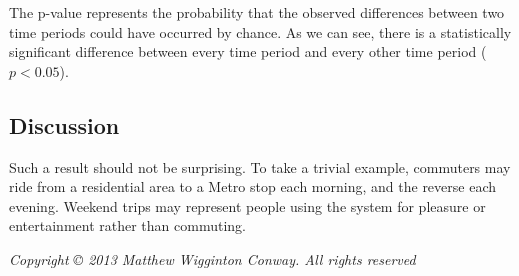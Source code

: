 \documentclass[letterpaper,11pt]{article}
\begin{document}
\noindent 

The p-value represents the probability that the observed differences
between two time periods could have occurred by chance. As we can see,
there is a statistically significant difference between every time
period and every other time period ($p < 0.05$).

\subsection{Discussion}

Such a result should not be surprising. To take a trivial example,
commuters may ride from a residential area to a Metro stop each
morning, and the reverse each evening. Weekend trips may represent
people using the system for pleasure or entertainment rather than
commuting. 




\newpage
\printbibliography

\emph{Copyright © 2013 Matthew Wigginton Conway. All rights reserved}
\end{document}
